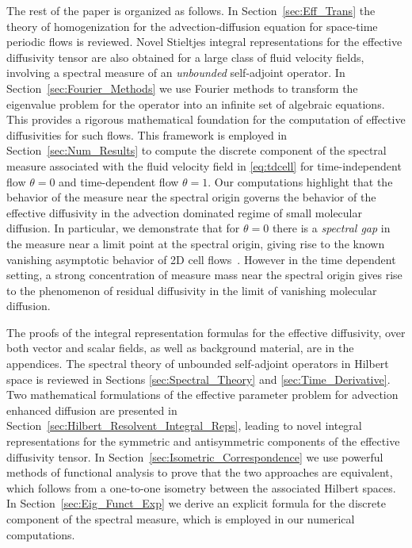 \documentclass[leqno,onefignum,onetabnum]{siamltex1213}
\newcommand{\secref}[1]{Section~\ref{#1}}
\begin{document}
The rest of the paper is organized as follows. In
\secref{sec:Eff_Trans} the theory of homogenization for the
advection-diffusion equation for space-time periodic flows is
reviewed. Novel Stieltjes integral representations for the effective
diffusivity tensor are also obtained for a large class of fluid
velocity fields, involving a spectral measure of an \emph{unbounded}
self-adjoint operator. In \secref{sec:Fourier_Methods} we use Fourier
methods to transform the eigenvalue problem for the operator into an
infinite set of algebraic equations. This provides a rigorous
mathematical foundation for the computation of effective diffusivities
for such flows. This framework is employed in \secref{sec:Num_Results}
to compute the discrete component of the spectral measure associated
with the fluid velocity field in \eqref{eq:tdcell} for time-independent
flow $\theta=0$ and time-dependent flow $\theta=1$. Our computations highlight
that the behavior of the measure near the spectral origin governs the
behavior of the effective diffusivity in the advection dominated
regime of small molecular diffusion. In particular, we demonstrate
that for $\theta=0$ there is a \emph{spectral gap} in the measure near a
limit point at the spectral origin, giving rise to the known vanishing
asymptotic behavior of 2D cell
flows~\cite{Fannjiang:1994:SIAM_JAM:333}. However in the time
dependent setting, a strong concentration of measure mass near the
spectral origin gives rise to the phenomenon of residual diffusivity
in the limit of vanishing molecular diffusion.


The proofs of the integral  representation formulas for the  effective
diffusivity, over both vector and scalar fields, as well as background
material, are in the appendices. The spectral theory of unbounded self-adjoint
operators in Hilbert space is reviewed in Sections
\ref{sec:Spectral_Theory} and \ref{sec:Time_Derivative}. Two
mathematical formulations of the effective parameter problem for
advection enhanced diffusion are presented in
\secref{sec:Hilbert_Resolvent_Integral_Reps}, leading to novel
integral representations for the symmetric and antisymmetric
components of the effective diffusivity tensor. In
\secref{sec:Isometric_Correspondence} we use powerful methods of
functional analysis to prove that the two approaches are equivalent,
which follows from a one-to-one isometry between the associated
Hilbert spaces. In \secref{sec:Eig_Funct_Exp} we derive an explicit
formula for the discrete component of the spectral measure, which is
employed in our numerical computations.
\end{document}
